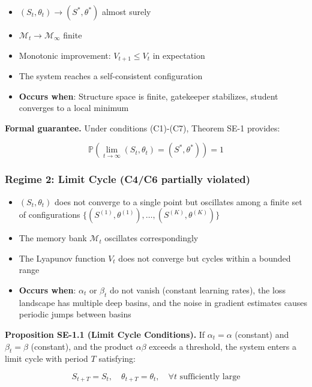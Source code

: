 \documentclass[
  12pt,
]{article}
\providecommand{\tightlist}{%
  \setlength{\itemsep}{0pt}\setlength{\parskip}{0pt}}
\begin{document}
\begin{itemize}
\tightlist
\item
  \((S_t, \theta_t) \to (S^*, \theta^*)\) almost surely
\item
  \(\mathcal{M}_t \to \mathcal{M}_\infty\) finite
\item
  Monotonic improvement: \(V_{t+1} \leq V_t\) in expectation
\item
  The system reaches a self-consistent configuration
\item
  \textbf{Occurs when}: Structure space is finite, gatekeeper
  stabilizes, student converges to a local minimum
\end{itemize}

\textbf{Formal guarantee.} Under conditions (C1)-(C7), Theorem SE-1
provides:

\[
\mathbb{P}\left( \lim_{t \to \infty} (S_t, \theta_t) = (S^*, \theta^*) \right) = 1
\]

\subsubsection{Regime 2: Limit Cycle (C4/C6 partially
violated)}\label{regime-2-limit-cycle-c4c6-partially-violated}

\begin{itemize}
\tightlist
\item
  \((S_t, \theta_t)\) does not converge to a single point but oscillates
  among a finite set of configurations
  \(\{(S^{(1)}, \theta^{(1)}), \dots, (S^{(K)}, \theta^{(K)})\}\)
\item
  The memory bank \(\mathcal{M}_t\) oscillates correspondingly
\item
  The Lyapunov function \(V_t\) does not converge but cycles within a
  bounded range
\item
  \textbf{Occurs when}: \(\alpha_t\) or \(\beta_t\) do not vanish
  (constant learning rates), the loss landscape has multiple deep
  basins, and the noise in gradient estimates causes periodic jumps
  between basins
\end{itemize}

\textbf{Proposition SE-1.1 (Limit Cycle Conditions).} If
\(\alpha_t = \alpha\) (constant) and \(\beta_t = \beta\) (constant), and
the product \(\alpha \beta\) exceeds a threshold, the system enters a
limit cycle with period \(T\) satisfying:

\[
S_{t+T} = S_t, \quad \theta_{t+T} = \theta_t, \quad \forall t \text{ sufficiently large}
\]
\end{document}
